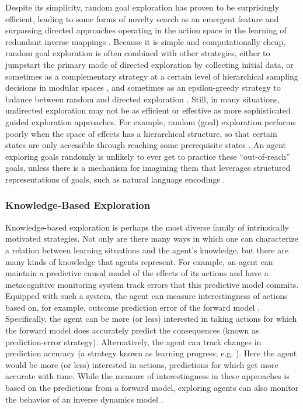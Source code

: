 Despite its simplicity, random goal exploration has proven to be surprisingly efficient, leading to some forms of novelty search as an emergent feature and surpassing directed approaches operating in the action space in the learning of redundant inverse mappings \parencite{benureau_behavioral_2016,colas_gep-pg_2018}. Because it is simple and computationally cheap, random goal exploration is often combined with other strategies, either to jumpstart the primary mode of directed exploration by collecting initial data, or sometimes as a complementary strategy at a certain level of hierarchical sampling decisions in modular spaces \parencite[e.g.,][]{forestier_intrinsically_2020}, and sometimes as an epsilon-greedy strategy \parencite[see][]{sutton2018reinforcement} to balance between random and directed exploration \parencite[e.g.,][]{colas_curious_2019}. Still, in many situations, undirected exploration may not be as efficient or effective as more sophisticated guided exploration approaches. For example, random (goal) exploration performs poorly when the space of effects has a hierarchical structure, so that certain states are only accessible through reaching some prerequisite states \parencite[e.g.,][]{forestier_intrinsically_2020}. An agent exploring goals randomly is unlikely to ever get to practice these “out-of-reach” goals, unless there is a mechanism for imagining them that leverages structured representations of goals, such as natural language encodings \parencite[e.g.,][]{colas_language_2020}.

\subsubsection{Knowledge-Based Exploration}\label{CH3_SSS_knowledge_based_exploration}
Knowledge-based exploration is perhaps the most diverse family of intrinsically motivated strategies. Not only are there many ways in which one can characterize a relation between learning situations and the agent’s knowledge, but there are many kinds of knowledge that agents represent. For example, an agent can maintain a predictive causal model of the effects of its actions and have a metacognitive monitoring system track errors that this predictive model commits. Equipped with such a system, the agent can measure interestingness of actions based on, for example, outcome prediction error of the forward model \parencite[e.g.,][]{saegusa_active_2009}. Specifically, the agent can be more (or less) interested in taking actions for which the forward model does accurately predict the consequences (known as prediction-error strategy). Alternatively, the agent can track changes in prediction accuracy (a strategy known as learning progress; e.g. \cite{schmidhuber_curious_1991,oudeyer_intrinsic_2007,kim_active_2020}). Here the agent would be more (or less) interested in actions, predictions for which get more accurate with time. While the measure of interestingness in these approaches is based on the predictions from a forward model, exploring agents can also monitor the behavior of an inverse dynamics model \parencite{pathak_curiosity-driven_2017,haber_learning_2018}.

